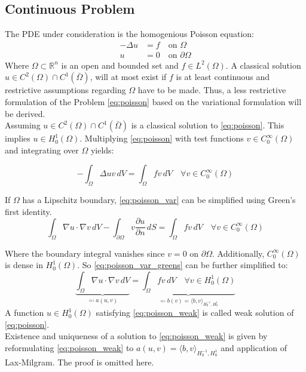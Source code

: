 \documentclass[11pt,a4paper]{article}
\begin{document}
\subsection*{Continuous Problem}
The PDE under consideration is the homogenious Poisson equation:
\begin{equation} \label{eq:poisson}
  \begin{split}
    - \Delta u &= f \quad \text{on } \Omega\\
    u &= 0 \quad \text{on } \partial\Omega
  \end{split}
\end{equation}
Where $\Omega \subset \mathbb{R}^n$ is an open and bounded set and $f \in L^2(\Omega)$.
A classical solution $u \in C^2(\Omega) \cap C^1(\bar{\Omega})$, will at most
exist if $f$ is at least continuous and restrictive assumptions regarding $\Omega$ have to be made.
Thus, a less restrictive formulation of the Problem \ref{eq:poisson} based on
the variational formulation will be derived.\\

Assuming $u \in C^2(\Omega) \cap C^1(\bar{\Omega})$ is a classical solution to
\ref{eq:poisson}. This implies $u \in H^1_0(\Omega)$.
Multiplying \ref{eq:poisson} with test functions $v \in C^\infty_0(\Omega)$ and
integrating over $\Omega$ yields:

\begin{equation} \label{eq:poisson_var}
  - \int_\Omega \Delta u v\,dV = \int_\Omega fv\,dV \quad \forall v \in C^\infty_0(\Omega)
\end{equation}

If $\Omega$ has a Lipschitz boundary, \ref{eq:poisson_var} can be simplified
using Green's first identity.
\begin{equation}\label{eq:poisson_var_greens}
    \int_\Omega \nabla u \cdot \nabla v \,dV
  - \int_{\partial\Omega} v \frac{\partial u}{\partial n} \,dS
  = \int_\Omega fv\,dV \quad \forall v \in C^\infty_0(\Omega)
\end{equation}

Where the boundary integral vanishes since $v = 0$ on $\partial\Omega$.
Additionally, $C^\infty_0(\Omega)$ is dense in $H^1_0(\Omega)$.
So \ref{eq:poisson_var_greens} can be further simplified to:
\begin{equation} \label{eq:poisson_weak}
  \underbrace{\int_\Omega \nabla u \cdot \nabla v \,dV}_{\eqqcolon a(u,v)}
  = \underbrace{\int_\Omega fv\,dV \quad \forall v \in
  H^1_0(\Omega)}_{\eqqcolon b(v) = \langle b, v \rangle_{H^{-1}_0, H^1_0}}
\end{equation}
A function $u \in H^1_0(\Omega)$ satisfying \ref{eq:poisson_weak} is called
weak solution of \ref{eq:poisson}.\\
Existence and uniqueness of a solution to \ref{eq:poisson_weak} is given by
reformulating \ref{eq:poisson_weak} to $a(u,v) = \langle b,v \rangle_{H^{-1}_0, H^1_0}$
and application of Lax-Milgram. The proof is omitted here.
\end{document}
